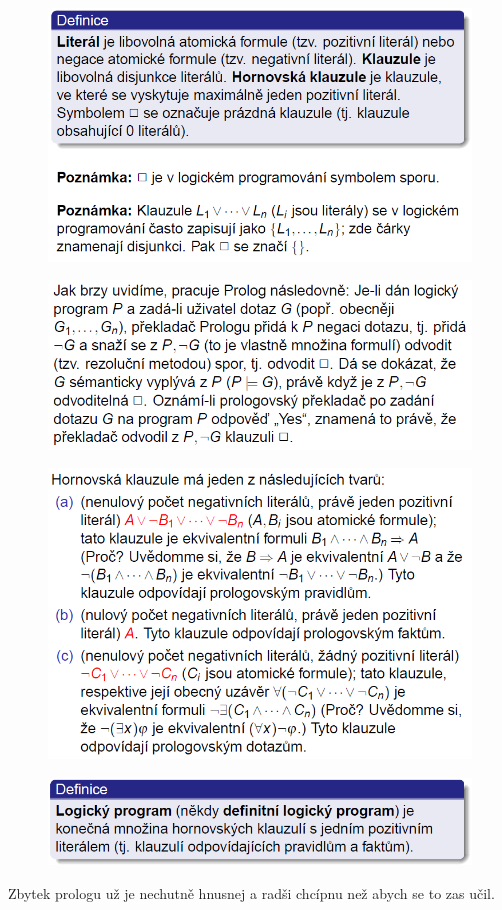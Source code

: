 \documentclass[10pt,a4paper]{article}
\theoremstyle{note}
\begin{document}
			\begin{figure}[H]
			\centering
			\includegraphics[width=13cm]{img/prolog6.png}
			\end{figure}

			\begin{figure}[H]
			\centering
			\includegraphics[width=13cm]{img/prolog7.png}
			\end{figure}

			\begin{figure}[H]
			\centering
			\includegraphics[width=13cm]{img/prolog8.png}
			\end{figure}

			\begin{figure}[H]
			\centering
			\includegraphics[width=13cm]{img/prolog9.png}
			\end{figure}

	Zbytek prologu už je nechutně hnusnej a radši chcípnu než abych se to zas učil.
\end{document}
